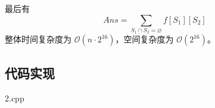 最后有 \[
Ans=\sum_{S_1\cap S_2 = \varnothing}f[S_1][S_2]
\] 整体时间复杂度为 \(\mathcal{O}(n\cdot 2^{16})\)，空间复杂度为
\(\mathcal{O}(2^{16})\)。

\subsection{代码实现}

2.cpp












